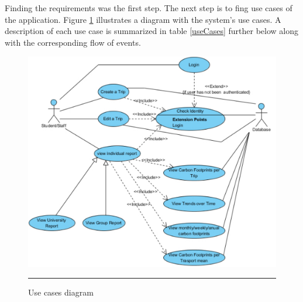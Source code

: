 Finding the requirements was the first step. The next step is to fing use cases of the application. Figure \ref{fig:useCasesDiagram} illustrates a diagram with the system's use cases. A description of each use case is summarized in table \ref{useCases} further below along with the corresponding flow of events.

\begin{figure}[htbp]
	\centering
		\includegraphics[scale=0.60]{./Figures/chapter4/figure2.pdf}
		\rule{35em}{0.5pt}
	\caption[Use cases diagram]{Use cases diagram}
	\label{fig:useCasesDiagram}
\end{figure}

